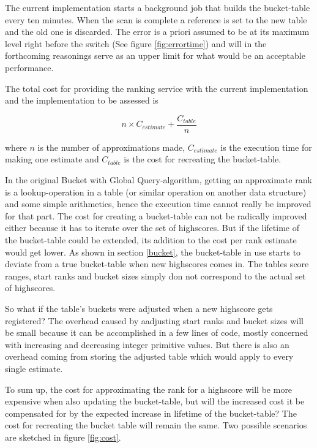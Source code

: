 The current implementation starts a background job that builds the bucket-table every ten minutes. When the scan is complete a reference is set to the new table and the old one is discarded. The error is a priori assumed to be at its maximum level right before the switch (See figure \ref{fig:errortime}) and will in the forthcoming reasonings serve as an upper limit for what would be an acceptable performance.

The total cost for providing the ranking service with the current implementation and the implementation to be assessed is

\begin{equation}
  n \times C_{estimate} + \frac{ C_{table}}{n}
\end{equation}

where $n$ is the number of approximations made, $C_{estimate}$ is the execution time for making one estimate and $C_{table}$ is the cost for recreating the bucket-table.

In the original Bucket with Global Query-algorithm, getting an approximate rank is a lookup-operation in a table (or similar operation on another data structure) and some simple arithmetics, hence the execution time cannot really be improved for that part. The cost for creating a bucket-table can not be radically improved either because it has to iterate over the set of highscores. But if the lifetime of the bucket-table could be extended, its addition to the cost per rank estimate would get lower. As shown in section \ref{bucket}, the bucket-table in use starts to deviate from a true bucket-table when new highscores comes in. The tables score ranges, start ranks and bucket sizes simply don not correspond to the actual set of highscores.

So what if the table's buckets were adjusted when a new highscore gets registered? The overhead caused by aadjusting start ranks and bucket sizes will be small because it can be accomplished in a few lines of code, mostly concerned with increasing and decreasing integer primitive values. But there is also an overhead coming from storing the adjusted table which would apply to every single estimate.

To sum up, the cost for approximating the rank for a highscore will be more expensive when also updating the bucket-table, but will the increased cost it be compensated for by the expected increase in lifetime of the bucket-table? The cost for recreating the bucket table will remain the same. Two possible scenarios are sketched in figure \ref{fig:cost}.

